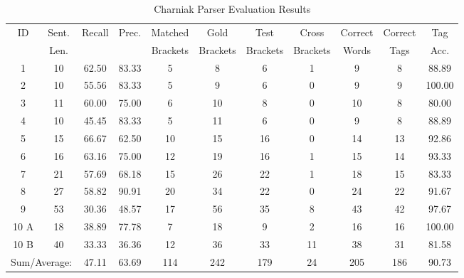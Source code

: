 \begin{table*}[htbp!]
\centering
\begin{tabular}{@{}ccccccccccc@{}}
\toprule
ID & Sent. & Recall & Prec. & Matched & Gold & Test & Cross & Correct & Correct & Tag \\
 & Len. & & & Brackets & Brackets & Brackets & Brackets & Words & Tags & Acc. \\
\midrule
1 & 10 & 62.50 & 83.33 & 5 & 8 & 6 & 1 & 9 & 8 & 88.89 \\
2 & 10 & 55.56 & 83.33 & 5 & 9 & 6 & 0 & 9 & 9 & 100.00 \\
3 & 11 & 60.00 & 75.00 & 6 & 10 & 8 & 0 & 10 & 8 & 80.00 \\
4 & 10 & 45.45 & 83.33 & 5 & 11 & 6 & 0 & 9 & 8 & 88.89 \\
5 & 15 & 66.67 & 62.50 & 10 & 15 & 16 & 0 & 14 & 13 & 92.86 \\
6 & 16 & 63.16 & 75.00 & 12 & 19 & 16 & 1 & 15 & 14 & 93.33 \\
7 & 21 & 57.69 & 68.18 & 15 & 26 & 22 & 1 & 18 & 15 & 83.33 \\
8 & 27 & 58.82 & 90.91 & 20 & 34 & 22 & 0 & 24 & 22 & 91.67 \\
9 & 53 & 30.36 & 48.57 & 17 & 56 & 35 & 8 & 43 & 42 & 97.67 \\
10 A & 18 & 38.89 & 77.78 & 7 & 18 & 9 & 2 & 16 & 16 & 100.00 \\
10 B & 40 & 33.33 & 36.36 & 12 & 36 & 33 & 11 & 38 & 31 & 81.58 \\
\midrule
\multicolumn{2}{l}{Sum/Average:} & 47.11 & 63.69 & 114 & 242 & 179 & 24 & 205 & 186 & 90.73 \\
\bottomrule
\end{tabular}
\caption{Charniak Parser Evaluation Results}
\label{{tab:parser_eval}}
\end{table*}
